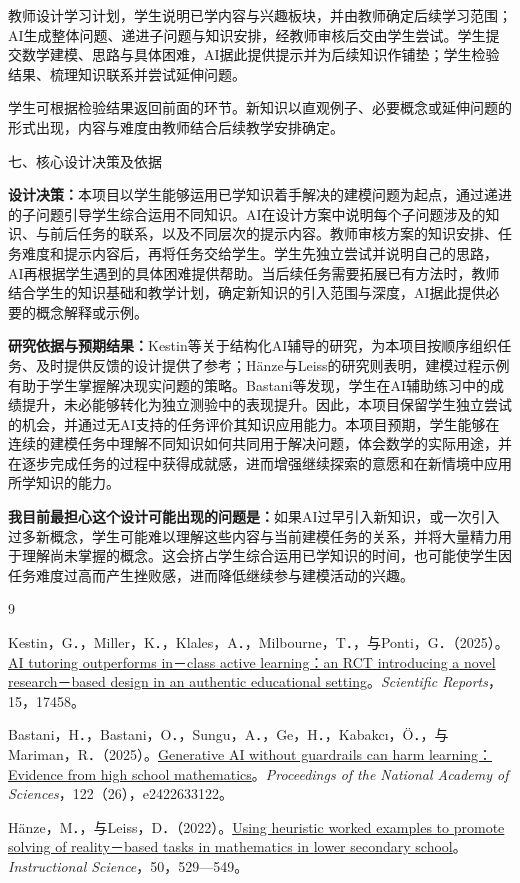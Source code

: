 \documentclass[UTF8,a4paper,11pt,fontset=windows]{ctexart}
\newcommand{\lead}[1]{\par\addvspace{7pt}\noindent
  {\sffamily\fontsize{11.5pt}{16pt}\selectfont #1}\par\nobreak\vspace{1pt}}
\begin{document}
教师设计学习计划，学生说明已学内容与兴趣板块，并由教师确定后续学习范围；AI生成整体问题、递进子问题与知识安排，经教师审核后交由学生尝试。学生提交数学建模、思路与具体困难，AI据此提供提示并为后续知识作铺垫；学生检验结果、梳理知识联系并尝试延伸问题。

学生可根据检验结果返回前面的环节。新知识以直观例子、必要概念或延伸问题的形式出现，内容与难度由教师结合后续教学安排确定。

\lead{七、核心设计决策及依据}

\textbf{设计决策：}本项目以学生能够运用已学知识着手解决的建模问题为起点，通过递进的子问题引导学生综合运用不同知识。AI在设计方案中说明每个子问题涉及的知识、与前后任务的联系，以及不同层次的提示内容。教师审核方案的知识安排、任务难度和提示内容后，再将任务交给学生。学生先独立尝试并说明自己的思路，AI再根据学生遇到的具体困难提供帮助。当后续任务需要拓展已有方法时，教师结合学生的知识基础和教学计划，确定新知识的引入范围与深度，AI据此提供必要的概念解释或示例。

\textbf{研究依据与预期结果：}Kestin等关于结构化AI辅导的研究，为本项目按顺序组织任务、及时提供反馈的设计提供了参考\cite{kestin2025}；Hänze与Leiss的研究则表明，建模过程示例有助于学生掌握解决现实问题的策略\cite{hanze2022}。Bastani等发现，学生在AI辅助练习中的成绩提升，未必能够转化为独立测验中的表现提升\cite{bastani2025}。因此，本项目保留学生独立尝试的机会，并通过无AI支持的任务评价其知识应用能力。本项目预期，学生能够在连续的建模任务中理解不同知识如何共同用于解决问题，体会数学的实际用途，并在逐步完成任务的过程中获得成就感，进而增强继续探索的意愿和在新情境中应用所学知识的能力。

\textbf{我目前最担心这个设计可能出现的问题是：}如果AI过早引入新知识，或一次引入过多新概念，学生可能难以理解这些内容与当前建模任务的关系，并将大量精力用于理解尚未掌握的概念。这会挤占学生综合运用已学知识的时间，也可能使学生因任务难度过高而产生挫败感，进而降低继续参与建模活动的兴趣。


\begingroup
\fontsize{9pt}{11.5pt}\selectfont
\begin{thebibliography}{9}
\setlength{\itemsep}{2pt}
\setlength{\parsep}{0pt}
\setlength{\parskip}{0pt}

Kestin，G．，Miller，K．，Klales，A．，Milbourne，T．，与Ponti，G．（2025）。\href{https://doi.org/10.1038/s41598-025-97652-6}{AI tutoring outperforms in－class active learning：an RCT introducing a novel research－based design in an authentic educational setting}。\textit{Scientific Reports}，15，17458。

Bastani，H．，Bastani，O．，Sungu，A．，Ge，H．，Kabakcı，Ö．，与Mariman，R．（2025）。\href{https://doi.org/10.1073/pnas.2422633122}{Generative AI without guardrails can harm learning：Evidence from high school mathematics}。\textit{Proceedings of the National Academy of Sciences}，122（26），e2422633122。

Hänze，M．，与Leiss，D．（2022）。\href{https://doi.org/10.1007/s11251-022-09583-8}{Using heuristic worked examples to promote solving of reality－based tasks in mathematics in lower secondary school}。\textit{Instructional Science}，50，529—549。


\end{thebibliography}
\endgroup
\end{document}
